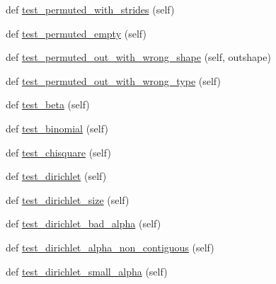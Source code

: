 \begin{DoxyCompactItemize}
def \hyperlink{classnumpy_1_1random_1_1tests_1_1test__generator__mt19937_1_1TestRandomDist_ad70e8aedb0827695598a176d066eeed1}{test\+\_\+permuted\+\_\+with\+\_\+strides} (self)
\item 
def \hyperlink{classnumpy_1_1random_1_1tests_1_1test__generator__mt19937_1_1TestRandomDist_a2c4171793d919a85b56046b6789f2bff}{test\+\_\+permuted\+\_\+empty} (self)
\item 
def \hyperlink{classnumpy_1_1random_1_1tests_1_1test__generator__mt19937_1_1TestRandomDist_afa335bfb4b75d201e5c9af7a73d86907}{test\+\_\+permuted\+\_\+out\+\_\+with\+\_\+wrong\+\_\+shape} (self, outshape)
\item 
def \hyperlink{classnumpy_1_1random_1_1tests_1_1test__generator__mt19937_1_1TestRandomDist_a66b3f0ba05bdd737fd8386ccee9d5ba6}{test\+\_\+permuted\+\_\+out\+\_\+with\+\_\+wrong\+\_\+type} (self)
\item 
def \hyperlink{classnumpy_1_1random_1_1tests_1_1test__generator__mt19937_1_1TestRandomDist_af802b47df61a57082620590ec4199909}{test\+\_\+beta} (self)
\item 
def \hyperlink{classnumpy_1_1random_1_1tests_1_1test__generator__mt19937_1_1TestRandomDist_ae5bf062529d01f28d8d370a40a7354d2}{test\+\_\+binomial} (self)
\item 
def \hyperlink{classnumpy_1_1random_1_1tests_1_1test__generator__mt19937_1_1TestRandomDist_a88056a2ff1c441c9894e349060952f7e}{test\+\_\+chisquare} (self)
\item 
def \hyperlink{classnumpy_1_1random_1_1tests_1_1test__generator__mt19937_1_1TestRandomDist_a2dacd6742507be6ba6b71cc19fa8e3d0}{test\+\_\+dirichlet} (self)
\item 
def \hyperlink{classnumpy_1_1random_1_1tests_1_1test__generator__mt19937_1_1TestRandomDist_a5d310a9c781ce4e2f09f552c431fad6e}{test\+\_\+dirichlet\+\_\+size} (self)
\item 
def \hyperlink{classnumpy_1_1random_1_1tests_1_1test__generator__mt19937_1_1TestRandomDist_a07b4d812104e26a887ca59fc78848e59}{test\+\_\+dirichlet\+\_\+bad\+\_\+alpha} (self)
\item 
def \hyperlink{classnumpy_1_1random_1_1tests_1_1test__generator__mt19937_1_1TestRandomDist_a8f35f25cd399b77488abdd76f47960bd}{test\+\_\+dirichlet\+\_\+alpha\+\_\+non\+\_\+contiguous} (self)
\item 
def \hyperlink{classnumpy_1_1random_1_1tests_1_1test__generator__mt19937_1_1TestRandomDist_a81004445e68a39fe179467e868499718}{test\+\_\+dirichlet\+\_\+small\+\_\+alpha} (self)
\item 

\end{DoxyCompactItemize}
